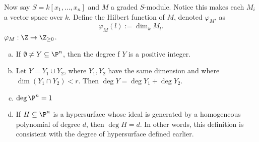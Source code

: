 Now say $S= k[x_1,\ldots,x_n]$ and $M$ a graded $S$-module. Notice this makes each $M_i$ a vector space over $k$. Define the Hilbert function of $M$, denoted $\varphi_M$, as 
	\[
	\varphi_M(l):= \dim_k M_l.
	\]
$\varphi_M: \Z \to \Z_{\geq 0}$. 









\begin{prop} \hfill
\begin{enumerate}[(a)]
\item If $\emptyset \neq Y \subseteq \P^n$, then the degree f $Y$ is a positive integer.
\item Let $Y= Y_1 \cup Y_2$, where $Y_1, Y_2$ have the same dimension and where $\dim(Y_1 \cap Y_2) < r$. Then $\deg Y= \deg Y_1 + \deg Y_2$.
\item $\deg \P^n= 1$
\item If $H \subseteq \P^n$ is a hypersurface whose ideal is generated by a homogeneous polynomial of degree $d$, then $\deg H= d$. In other words, this definition is consistent with the degree of hypersurface defined earlier.
\end{enumerate}
\end{prop}

